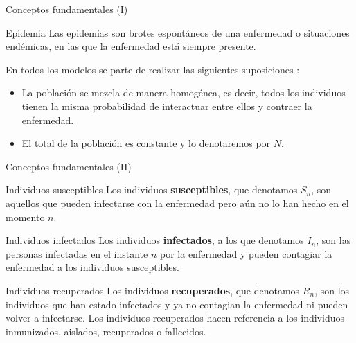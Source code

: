 



\begin{frame}{Conceptos fundamentales (I)}

    \begin{block}{Epidemia}
        Las epidemias son brotes espontáneos de una enfermedad o situaciones endémicas, en las que la enfermedad está siempre presente.
    \end{block}  

    \pause

    En todos los modelos se parte de realizar las siguientes suposiciones \cite{allenDiscretetimeSISIR1994}:

    \begin{itemize}
        \item La población se mezcla de manera homogénea, es decir, todos los individuos tienen la misma probabilidad de interactuar entre ellos y contraer la enfermedad.
        \item El total de la población es constante y lo denotaremos por $N$.
    \end{itemize}

\end{frame}


\begin{frame}{Conceptos fundamentales (II)}

    \begin{block}{Individuos susceptibles}
        Los individuos \textbf{susceptibles}, que denotamos $S_n$, son aquellos que pueden infectarse con la enfermedad pero aún no lo han hecho en el momento $n$.
    \end{block}  

    \pause

    \begin{block}{Individuos infectados}
        Los individuos \textbf{infectados}, a los que denotamos $I_n$, son las personas infectadas en el instante $n$ por la enfermedad y pueden contagiar la enfermedad a los individuos susceptibles.
    \end{block}  

    \pause

    \begin{block}{Individuos recuperados}
        Los individuos \textbf{recuperados}, que denotamos $R_n$, son los individuos que han estado infectados y ya no contagian la enfermedad ni pueden volver a infectarse.
        Los individuos recuperados hacen referencia a los individuos inmunizados, aislados, recuperados o fallecidos.
    \end{block}  


\end{frame}


